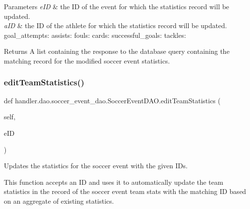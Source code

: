 \begin{DoxyParams}{Parameters}
{\em e\+ID} & the ID of the event for which the statistics record will be updated. \\
\hline
{\em a\+ID} & the ID of the athlete for which the statistics record will be updated. goal\+\_\+attempts\+: assists\+: fouls\+: cards\+: successful\+\_\+goals\+: tackles\+:\\
\hline
\end{DoxyParams}
\begin{DoxyReturn}{Returns}
A list containing the response to the database query containing the matching record for the modified soccer event statistics. 
\end{DoxyReturn}
\mbox{\label{classhandler_1_1dao_1_1soccer__event__dao_1_1_soccer_event_d_a_o_a27b8ccd06f79155891d27762f753113f}} 
\subsubsection{\texorpdfstring{edit\+Team\+Statistics()}{editTeamStatistics()}}
{\footnotesize\ttfamily def handler.\+dao.\+soccer\+\_\+event\+\_\+dao.\+Soccer\+Event\+D\+A\+O.\+edit\+Team\+Statistics (\begin{DoxyParamCaption}\item[{}]{self,  }\item[{}]{e\+ID }\end{DoxyParamCaption})}



Updates the statistics for the soccer event with the given I\+Ds. 

This function accepts an ID and uses it to automatically update the team statistics in the record of the soccer event team stats with the matching ID based on an aggregate of existing statistics.


